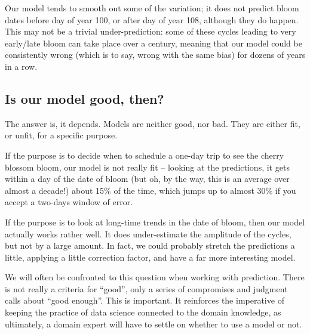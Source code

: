 \documentclass[
  letterpaper,
]{scrbook}
\begin{document}
Our model tends to smooth out some of the variation; it does not predict
bloom dates before day of year 100, or after day of year 108, although
they do happen. This may not be a trivial under-prediction: some of
these cycles leading to very early/late bloom can take place over a
century, meaning that our model could be consistently wrong (which is to
say, wrong with the same bias) for dozens of years in a row.

\subsection{Is our model good, then?}\label{sec-crossvalidation-fitness}

The answer is, it depends. Models are neither good, nor bad. They are
either fit, or unfit, for a specific purpose.

If the purpose is to decide when to schedule a one-day trip to see the
cherry blossom bloom, our model is not really fit -- looking at the
predictions, it gets within a day of the date of bloom (but oh, by the
way, this is an average over almost a decade!) about 15\% of the time,
which jumps up to almost 30\% if you accept a two-days window of error.

If the purpose is to look at long-time trends in the date of bloom, then
our model actually works rather well. It does under-estimate the
amplitude of the cycles, but not by a large amount. In fact, we could
probably stretch the predictions a little, applying a little correction
factor, and have a far more interesting model.

We will often be confronted to this question when working with
prediction. There is not really a criteria for ``good'', only a series
of compromises and judgment calls about ``good enough''. This is
important. It reinforces the imperative of keeping the practice of data
science connected to the domain knowledge, as ultimately, a domain
expert will have to settle on whether to use a model or not.
\end{document}
